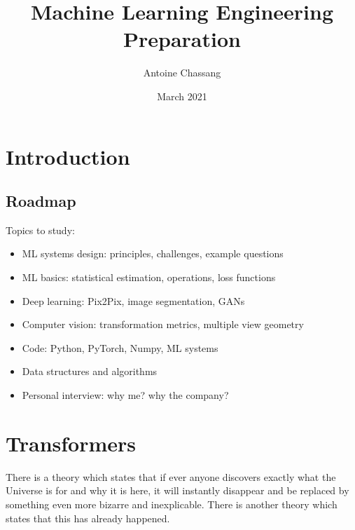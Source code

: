 \documentclass{report}
\title{Machine Learning Engineering Preparation}
\author{Antoine Chassang}
\date{March 2021}
\begin{document}
\maketitle
\tableofcontents
\chapter{Introduction}
    \section{Roadmap}
    Topics to study:
    \begin{itemize}
        \item ML systems design: principles, challenges, example questions
        \item ML basics: statistical estimation, operations, loss functions
        \item Deep learning: Pix2Pix, image segmentation, GANs
        \item Computer vision: transformation metrics, multiple view geometry
        \item Code: Python, PyTorch, Numpy, ML systems
        \item Data structures and algorithms
        \item Personal interview: why me? why the company?
    \end{itemize}


















\chapter{Transformers}
    There is a theory which states that if ever anyone discovers exactly what the Universe is for and why it is here, it will instantly disappear and be replaced by something even more bizarre and inexplicable.
    There is another theory which states that this has already happened.
\end{document}
